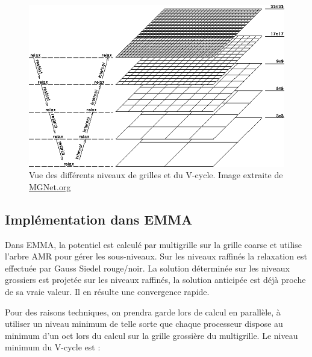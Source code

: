 \begin{figure}
\begin{center}
\includegraphics[scale=0.35]{img/02/multigrid.png}
\caption[Multigrille]{Vue des différents niveaux de grilles et du V-cycle.
 Image extraite de \href{http://MGNet.org}{MGNet.org} }
\label{fig:mgrid}
\end{center}
\end{figure}	


\subsection{Implémentation dans EMMA}
Dans EMMA, la potentiel est calculé par multigrille sur la grille coarse et utilise l'arbre \ac{AMR} pour gérer les sous-niveaux.
Sur les niveaux raffinés la relaxation est effectuée par Gauss Siedel rouge/noir.
La solution déterminée sur les niveaux grossiers est projetée sur les niveaux raffinés, la solution anticipée est déjà proche de sa vraie valeur. 
Il en résulte une convergence rapide.

Pour des raisons techniques, on prendra garde lors de calcul en parallèle, à utiliser un niveau minimum de telle sorte que chaque processeur dispose au minimum d'un oct lors du calcul sur la grille grossière du multigrille.
Le niveau minimum du V-cycle est : 

